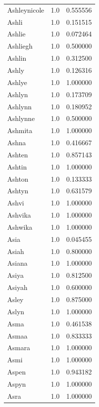 \documentclass[
  letterpaper,
  DIV=11,
  numbers=noendperiod]{scrreprt}
\begin{document}
\begin{tabular}{lrr}
Ashleynicole    &   1.0 &   0.555556 \\
Ashli           &   1.0 &   0.151515 \\
Ashlie          &   1.0 &   0.072464 \\
Ashliegh        &   1.0 &   0.500000 \\
Ashlin          &   1.0 &   0.312500 \\
Ashly           &   1.0 &   0.126316 \\
Ashlye          &   1.0 &   1.000000 \\
Ashlyn          &   1.0 &   0.173709 \\
Ashlynn         &   1.0 &   0.180952 \\
Ashlynne        &   1.0 &   0.500000 \\
Ashmita         &   1.0 &   1.000000 \\
Ashna           &   1.0 &   0.416667 \\
Ashten          &   1.0 &   0.857143 \\
Ashtin          &   1.0 &   1.000000 \\
Ashton          &   1.0 &   0.133333 \\
Ashtyn          &   1.0 &   0.631579 \\
Ashvi           &   1.0 &   1.000000 \\
Ashvika         &   1.0 &   1.000000 \\
Ashwika         &   1.0 &   1.000000 \\
Asia            &   1.0 &   0.045455 \\
Asiah           &   1.0 &   0.800000 \\
Asiana          &   1.0 &   1.000000 \\
Asiya           &   1.0 &   0.812500 \\
Asiyah          &   1.0 &   0.600000 \\
Asley           &   1.0 &   0.875000 \\
Aslyn           &   1.0 &   1.000000 \\
Asma            &   1.0 &   0.461538 \\
Asmaa           &   1.0 &   0.833333 \\
Asmara          &   1.0 &   1.000000 \\
Asmi            &   1.0 &   1.000000 \\
Aspen           &   1.0 &   0.943182 \\
Aspyn           &   1.0 &   1.000000 \\
Asra            &   1.0 &   1.000000 \\

\end{tabular}
\end{document}
